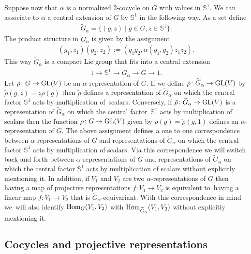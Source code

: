 \documentclass[10pt,a4paper]{amsart}
\def\S{\mathbb{S}}
\DeclareMathOperator{\Hom}{\textup{Hom}}
\theoremstyle{definition}
\numberwithin{equation}{section}
\begin{document}
Suppose now that $\alpha$ is a normalized 2-cocycle on $G$ with values in $\S^{1}$.
We can associate to $\alpha$ a central extension of $G$ by $\S^{1}$ in the following way.
As a set define
\begin{gather*}%
\widetilde{G}_{\alpha}=\big\{(g,z)\mid g\in G, z\in \S^{1}\big\}.
\end{gather*}
The product structure in $\widetilde{G}_{\alpha}$ is given by
the assignment
\begin{gather*}
(g_{1},z_{1})(g_{2},z_{2}):=\left(g_{1}g_{2},\alpha(g_{1},g_{2})z_{1}z_{2}\right).
\end{gather*}
This way $\widetilde{G}_{\alpha}$ is a compact Lie group that fits
into a central extension
\begin{gather*}
1\rightarrow \S^{1}\rightarrow
\widetilde{G}_{\alpha}\rightarrow G\rightarrow 1.
\end{gather*}
Let $\rho\colon G\to {\rm GL}(V)$ be an $\alpha$-representation of $G$. If we define
$\tilde{\rho}\colon \widetilde{G}_{\alpha}\to {\rm GL}(V)$
by $\tilde{\rho}(g,z)=z\rho(g)$ then $\tilde{\rho}$ defines a representation of
$\widetilde{G}_{\alpha}$ on which the central factor $\S^{1}$ acts by multiplication of~scalars.
Conversely, if $\tilde{\rho}\colon \widetilde{G}_{\alpha}\to {\rm GL}(V)$ is a representation of
$\widetilde{G}_{\alpha}$ on which the central factor~$\S^{1}$ acts by multiplication of scalars
then the function $\rho\colon G\to {\rm GL}(V)$ given by $\rho(g)=\tilde{\rho}(g,1)$ defines an
$\alpha$-representation of $G$. The above assignment defines a one to one correspondence between
$\alpha$-representations of $G$ and representations of $\widetilde{G}_{\alpha}$ on which the
central factor $\S^{1}$ acts by multiplication of scalars. Via this correspondence we will
switch back and forth between $\alpha$-representations of $G$ and representations of
$\widetilde{G}_{\alpha}$ on which the central factor $\S^{1}$ acts by multiplication of scalars
without explicitly mentioning it. In addition, if $V_{1}$ and $V_{2}$ are two
$\alpha$-repre\-sentations of $G$ then having a map of projective representations
$f\colon V_{1}\to V_{2}$ is equivalent to~having a linear map
$f\colon V_{1}\to V_{2}$ that is $\widetilde{G}_{\alpha}$-equivariant. With this correspondence
in mind we~will also identify $\Hom_{G}(V_{1},V_{2})$ with
$\Hom_{\widetilde{G}_{\alpha}}(V_{1},V_{2})$ without explicitly mentioning it.

\subsection{Cocycles and projective representations}\label{section cocycles}
\end{document}
